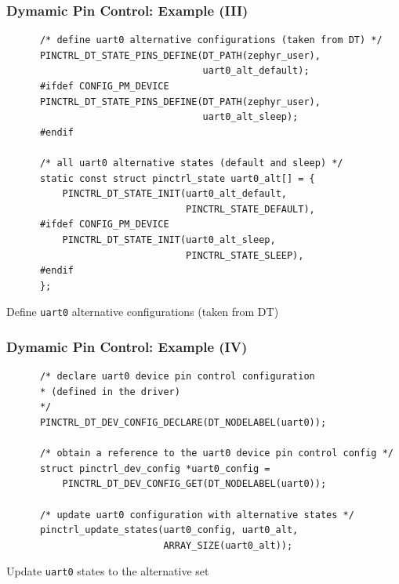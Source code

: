 \documentclass[handout]{beamer}
\begin{document}
\begin{frame}[fragile]
  \frametitle{Dymamic Pin Control: Example (III)}

  \begin{listing}[H]
    \begin{verbatim}
      /* define uart0 alternative configurations (taken from DT) */
      PINCTRL_DT_STATE_PINS_DEFINE(DT_PATH(zephyr_user),
                                   uart0_alt_default);
      #ifdef CONFIG_PM_DEVICE
      PINCTRL_DT_STATE_PINS_DEFINE(DT_PATH(zephyr_user),
                                   uart0_alt_sleep);
      #endif

      /* all uart0 alternative states (default and sleep) */
      static const struct pinctrl_state uart0_alt[] = {
          PINCTRL_DT_STATE_INIT(uart0_alt_default,
                                PINCTRL_STATE_DEFAULT),
      #ifdef CONFIG_PM_DEVICE
          PINCTRL_DT_STATE_INIT(uart0_alt_sleep,
                                PINCTRL_STATE_SLEEP),
      #endif
      };
    \end{verbatim}
    \caption{Define \texttt{uart0} alternative configurations (taken from DT)}
  \end{listing}
\end{frame}

\begin{frame}[fragile]
  \frametitle{Dymamic Pin Control: Example (IV)}

  \begin{listing}[H]
    \begin{verbatim}
      /* declare uart0 device pin control configuration
      * (defined in the driver)
      */
      PINCTRL_DT_DEV_CONFIG_DECLARE(DT_NODELABEL(uart0));

      /* obtain a reference to the uart0 device pin control config */
      struct pinctrl_dev_config *uart0_config =
          PINCTRL_DT_DEV_CONFIG_GET(DT_NODELABEL(uart0));

      /* update uart0 configuration with alternative states */
      pinctrl_update_states(uart0_config, uart0_alt,
                            ARRAY_SIZE(uart0_alt));
    \end{verbatim}
    \caption{Update \texttt{uart0} states to the alternative set}
  \end{listing}
\end{frame}
\end{document}
